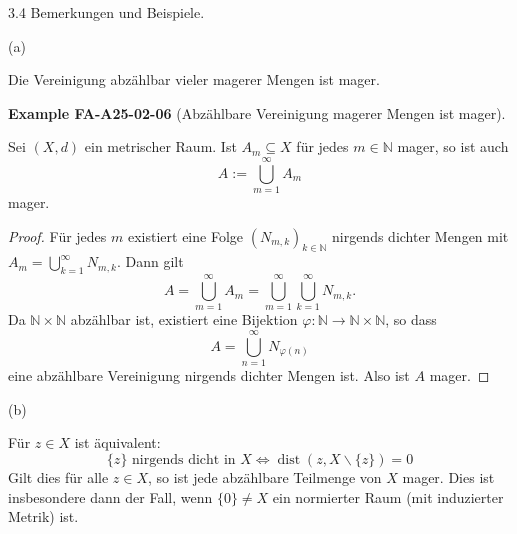 \documentclass[10pt, letterpaper]{article}
\newcommand{\CustomHeading}[3]{%
  \par\medskip\noindent%
  \textbf{#1 #2} \textnormal{(#3)}.\enskip%
}
\newenvironment{EXA}[2]{\begin{unitbox}\CustomHeading{Example}{#1}{#2}}{\end{unitbox}}
\begin{document}
3.4 Bemerkungen und Beispiele. 

(a) 

Die Vereinigung abzählbar vieler magerer Mengen ist mager.




\begin{EXA}{FA-A25-02-06}{Abzählbare Vereinigung magerer Mengen ist mager}
Sei $(X,d)$ ein metrischer Raum. Ist $A_m\subseteq X$ für jedes $m\in\mathbb{N}$ mager, so ist auch
\[
A:=\bigcup_{m=1}^\infty A_m
\]
mager.

\begin{proof}
Für jedes $m$ existiert eine Folge $(N_{m,k})_{k\in\mathbb{N}}$ nirgends dichter Mengen mit
$A_m=\bigcup_{k=1}^\infty N_{m,k}$. Dann gilt
\[
A=\bigcup_{m=1}^\infty A_m=\bigcup_{m=1}^\infty\bigcup_{k=1}^\infty N_{m,k}.
\]
Da $\mathbb{N}\times\mathbb{N}$ abzählbar ist, existiert eine Bijektion
$\varphi:\mathbb{N}\to\mathbb{N}\times\mathbb{N}$, so dass
\[
A=\bigcup_{n=1}^\infty N_{\varphi(n)}
\]
eine abzählbare Vereinigung nirgends dichter Mengen ist. Also ist $A$ mager.
\end{proof}
\end{EXA}




(b) 


Für $z \in X$ ist äquivalent:
$$
\{z\} \text { nirgends dicht in } X \Longleftrightarrow \operatorname{dist}(z, X \backslash\{z\})=0
$$
Gilt dies für alle $z \in X$, so ist jede abzählbare Teilmenge von $X$ mager. Dies ist insbesondere dann der Fall, wenn $\{0\} \neq X$ ein normierter Raum (mit induzierter Metrik) ist.
\end{document}
